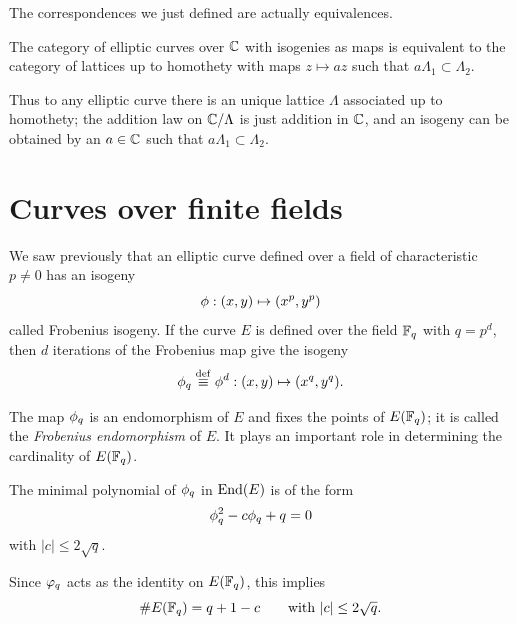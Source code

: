 The correspondences we just defined are actually equivalences.

\begin{theorem}
  The category of elliptic curves over $\mathbb{C}$ with isogenies as maps is
  equivalent to the category of lattices up to homothety with maps
  $z\mapsto az$ such that $a\Lambda_1\subset\Lambda_2$.
\end{theorem}

Thus to any elliptic curve there is an unique lattice $\Lambda$
associated up to homothety; the addition law on $\mathbb{C}/\Lambda$ is just
addition in $\mathbb{C}$, and an isogeny can be obtained by an $a\in\mathbb{C}$ such
that $a\Lambda_1\subset\Lambda_2$.



\section{Curves over finite fields}
\label{sec:curves-over-finite}
We saw previously that an elliptic curve defined over a field of
characteristic $p\ne0$ has an isogeny
\begin{equation}
  \label{eq:150}
  \phi:(x,y)\mapsto(x^p,y^p)
\end{equation}
called Frobenius isogeny. If the curve $E$ is defined over the field
$\mathbb{F}_q$ with $q=p^d$, then $d$ iterations of the Frobenius map give the
isogeny
\begin{equation}
  \label{eq:151}
  \phi_q\overset{\mathrm{def}}{\equiv}\phi^d:(x,y)\mapsto(x^q,y^q)
  \text{.}
\end{equation}

The map $\phi_q$ is an endomorphism of $E$ and fixes the points
of $E(\mathbb{F}_q)$; it is called the
\emph{Frobenius
  endomorphism} of $E$. It plays an important
role in determining the cardinality of $E(\mathbb{F}_q)$.

\begin{theorem}[Hasse]
  The minimal polynomial of $\phi_q$ in $\operatorname{End}(E)$ is of the form
  \begin{equation}
    \label{eq:152}
    \phi_q^2 - c\phi_q + q = 0
  \end{equation}
  with $\lvert c\rvert\le2\sqrt{q}$.
\end{theorem}

Since $\varphi_q$ acts as the identity on $E(\mathbb{F}_q)$, this implies
\begin{equation}
  \label{eq:153}
  \# E(\mathbb{F}_q) = q+1-c
  \qquad\text{with } \lvert c\rvert\le2\sqrt{q}
  \text{.}
\end{equation}

